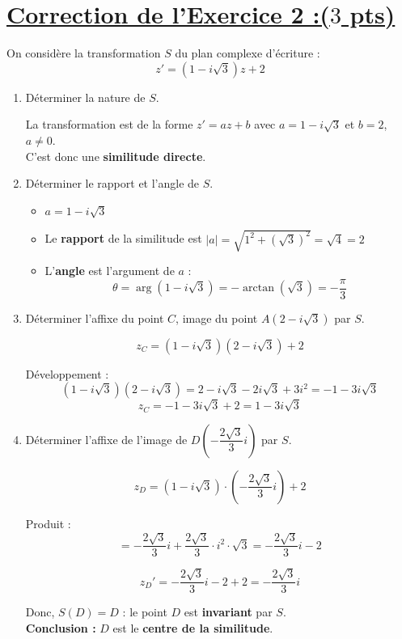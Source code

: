 \documentclass[12pt,a4paper]{article}
\begin{document}
\section*{\underline{Correction de l'Exercice 2 :($3$ pts)}}

On considère la transformation \( S \) du plan complexe d’écriture :
\[
z' = (1 - i\sqrt{3})z + 2
\]

\begin{enumerate}
    \item Déterminer la nature de \( S \).

    La transformation est de la forme \( z' = az + b \) avec \( a = 1 - i\sqrt{3} \) et \( b = 2 \), \( a \neq 0 \).\\
    C’est donc une \textbf{similitude directe}.

    \item Déterminer le rapport et l’angle de \( S \).

    \begin{itemize}
        \item \( a = 1 - i\sqrt{3} \)
        \item Le \textbf{rapport} de la similitude est \( |a| = \sqrt{1^2 + (\sqrt{3})^2} = \sqrt{4} = 2 \)
        \item L’\textbf{angle} est l’argument de \( a \) : 
        \[
        \theta = \arg(1 - i\sqrt{3}) = -\arctan(\sqrt{3}) = -\frac{\pi}{3}
        \]
    \end{itemize}

    \item Déterminer l’affixe du point \( C \), image du point \( A(2 - i\sqrt{3}) \) par \( S \).

    \[
    z_C = (1 - i\sqrt{3})(2 - i\sqrt{3}) + 2
    \]

    Développement :
    \[
    (1 - i\sqrt{3})(2 - i\sqrt{3}) = 2 - i\sqrt{3} - 2i\sqrt{3} + 3i^2 = -1 - 3i\sqrt{3}
    \]
    \[
    z_C = -1 - 3i\sqrt{3} + 2 = \boxed{1 - 3i\sqrt{3}}
    \]

    \item Déterminer l’affixe de l’image de \( D\left(-\dfrac{2\sqrt{3}}{3}i\right) \) par \( S \).

    \[
    z_D = (1 - i\sqrt{3}) \cdot \left( -\dfrac{2\sqrt{3}}{3}i \right) + 2
    \]

    Produit :
    \[
    = -\dfrac{2\sqrt{3}}{3}i + \dfrac{2\sqrt{3}}{3} \cdot i^2 \cdot \sqrt{3} = -\dfrac{2\sqrt{3}}{3}i - 2
    \]

    \[
    z_D' = -\dfrac{2\sqrt{3}}{3}i - 2 + 2 = \boxed{-\dfrac{2\sqrt{3}}{3}i}
    \]

    Donc, \( S(D) = D \) : le point \( D \) est \textbf{invariant} par \( S \).\\
    \textbf{Conclusion :} \( D \) est le \textbf{centre de la similitude}.

\end{enumerate}
\end{document}
